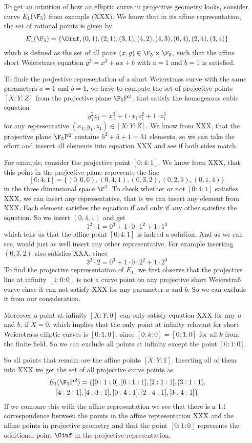 \begin{example} To get an intuition of how an elliptic curve in projective geometry looks, consider curve $E_1(\F_5)$ from example (XXX). We know that in its affine representation, the set of rational points is given by 
$$
E_1(\F_5) = \{\Oinf, (0,1),(2,1),(3,1),(4,2),(4,3),(0,4),(2,4),(3,4)\}
$$
which is defined as the set of all pairs $(x,y)\in \F_5\times \F_5$, such that the affine short Weierstrass equation $y^2 = x^3 + ax +b$ with $a=1$ and $b=1$ is satisfied.

To finde the projective representation of a short Weierstrass curve with the same parameters $a=1$ and $b=1$, we have to compute the set of projective points $[X:Y:Z]$ from the projective plane $\F_5\mathrm{P}^2$, that satisfy the homogenous cubic equation 
$$
y_1^2z_1 = x_1^3 + 1\cdot x_1 z_1^2 + 1\cdot z_1^3
$$
for any representative $(x_1,y_1,z_1)\in [X:Y:Z]$. We know from XXX, that the projective plane $\F_5\mathrm{P}^2$ contains $5^2+5+1= 31$ elements, so we can take the effort and inseret all elements into equation XXX and see if both sides match.

For example, consider the projective point $[0:4:1]$. We know from XXX, that this point in the projective plane represents the line
$$
[0:4:1] = \{(0,0,0),(0,4,1),(0,3,2),(0,2,3),(0,1,4)\}
$$  
in the three dimensional space $\F^3$. To check whether or not $[0:4:1]$ satisfies XXX, we can insert any representative, that is we can insert any element from XXX. Each element satisfies the equation if and only if any other satisfies the equation. So we insert $(0,4,1)$ and get
$$
1^2\cdot 1 = 0^3 + 1\cdot 0\cdot 1^2 + 1\cdot 1^3
$$
which tells us that the affine point $[0:4:1]$ is indeed a solution. And as we can see, would just as well insert any other representative. For example inserting $(0,3,2)$ also satisfies XXX, since 
$$
3^2\cdot 2 = 0^3 + 1\cdot 0\cdot 2^2 + 1\cdot 2^3
$$
To find the projective reprresentation of $E_1$, we first observe that the projective line at infinity $[1:0:0]$ is not a curve point on any projective short Weierstraß curve since it can not satisfy XXX for any parameter $a$ and $b$. So we can exclude it from our consideration. 

Moreover a point at infinity $[X:Y:0]$ can only satisfy equation XXX for any $a$ and $b$, if $X=0$, which implies that the only point at infinity relavant for short Weierstrass elliptic curves is $[0:1:0]$, since $[0:k:0]= [0:1:0]$ for all $k$ from the finite field. So we can exclude all points at infinity except the point $[0:1:0]$.

So all points that remain are the affine points $[X:Y:1]$. Inserting all of them into XXX we get the set of all projective curve points as
\begin{multline*}
E_1(\F_5\mathrm{P}^2)=\{[0:1:0], [0:1:1], [2:1:1], [3:1:1], \\ [4:2:1], [4:3:1], [0:4:1], [2:4:1], [3:4:1]\}
\end{multline*}
If we compare this with the affine representation we see that there is a 1:1 correspondence between the points in the affine representation XXX and the affine points in projective geometry and that the point $[0:1:0]$ represents the additional point $\Oinf$ in the projective representation.
\end{example} 

